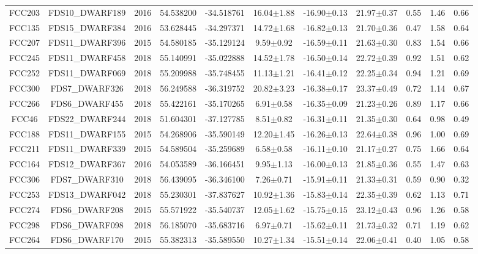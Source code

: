 \documentclass{aa}
\begin{document}
\begin{table}
\begin{center}
{{\begin{tabular}{|ccccccccccc|}
FCC203 & FDS10\_DWARF189 & 2016 & 54.538200 & -34.518761 & 16.04$\pm$1.88 & -16.90$\pm$0.13 & 21.97$\pm$0.37 & 0.55 & 1.46 & 0.66\\
FCC135 & FDS15\_DWARF384 & 2016 & 53.628445 & -34.297371 & 14.72$\pm$1.68 & -16.82$\pm$0.13 & 21.70$\pm$0.36 & 0.47 & 1.58 & 0.64\\
FCC207 & FDS11\_DWARF396 & 2015 & 54.580185 & -35.129124 & 9.59$\pm$0.92 & -16.59$\pm$0.11 & 21.63$\pm$0.30 & 0.83 & 1.54 & 0.66\\
FCC245 & FDS11\_DWARF458 & 2018 & 55.140991 & -35.022888 & 14.52$\pm$1.78 & -16.50$\pm$0.14 & 22.72$\pm$0.39 & 0.92 & 1.51 & 0.62\\
FCC252 & FDS11\_DWARF069 & 2018 & 55.209988 & -35.748455 & 11.13$\pm$1.21 & -16.41$\pm$0.12 & 22.25$\pm$0.34 & 0.94 & 1.21 & 0.69\\
FCC300 & FDS7\_DWARF326 & 2018 & 56.249588 & -36.319752 & 20.82$\pm$3.23 & -16.38$\pm$0.17 & 23.37$\pm$0.49 & 0.72 & 1.14 & 0.67\\
FCC266 & FDS6\_DWARF455 & 2018 & 55.422161 & -35.170265 & 6.91$\pm$0.58 & -16.35$\pm$0.09 & 21.23$\pm$0.26 & 0.89 & 1.17 & 0.66\\
FCC46 & FDS22\_DWARF244 & 2018 & 51.604301 & -37.127785 & 8.51$\pm$0.82 & -16.31$\pm$0.11 & 21.35$\pm$0.30 & 0.64 & 0.98 & 0.49\\
FCC188 & FDS11\_DWARF155 & 2015 & 54.268906 & -35.590149 & 12.20$\pm$1.45 & -16.26$\pm$0.13 & 22.64$\pm$0.38 & 0.96 & 1.00 & 0.69\\
FCC211 & FDS11\_DWARF339 & 2015 & 54.589504 & -35.259689 & 6.58$\pm$0.58 & -16.11$\pm$0.10 & 21.17$\pm$0.27 & 0.75 & 1.66 & 0.64\\
FCC164 & FDS12\_DWARF367 & 2016 & 54.053589 & -36.166451 & 9.95$\pm$1.13 & -16.00$\pm$0.13 & 21.85$\pm$0.36 & 0.55 & 1.47 & 0.63\\
FCC306 & FDS7\_DWARF310 & 2018 & 56.439095 & -36.346100 & 7.26$\pm$0.71 & -15.91$\pm$0.11 & 21.33$\pm$0.31 & 0.59 & 0.90 & 0.32\\
FCC253 & FDS13\_DWARF042 & 2018 & 55.230301 & -37.837627 & 10.92$\pm$1.36 & -15.83$\pm$0.14 & 22.35$\pm$0.39 & 0.62 & 1.13 & 0.71\\
FCC274 & FDS6\_DWARF208 & 2015 & 55.571922 & -35.540737 & 12.05$\pm$1.62 & -15.75$\pm$0.15 & 23.12$\pm$0.43 & 0.96 & 1.26 & 0.58\\
FCC298 & FDS6\_DWARF098 & 2018 & 56.185070 & -35.683716 & 6.97$\pm$0.71 & -15.62$\pm$0.11 & 21.73$\pm$0.32 & 0.71 & 1.19 & 0.62\\
FCC264 & FDS6\_DWARF170 & 2015 & 55.382313 & -35.589550 & 10.27$\pm$1.34 & -15.51$\pm$0.14 & 22.06$\pm$0.41 & 0.40 & 1.05 & 0.58\\

\end{tabular}}}
\end{center}
\end{table}
\end{document}
